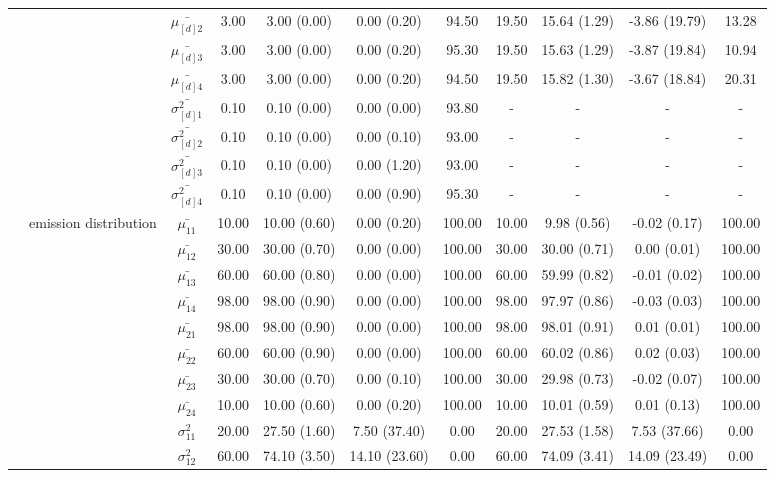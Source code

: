 \begin{table}[h]
{\begin{tabular}{ccccccccccc}
\multirow{39}{*}{} & \multirow{7}{*}{} & $\bar{\mu_{[d]2}}$ & 3.00 & 3.00 (0.00) & 0.00 (0.20) & 94.50 & 19.50 & 15.64 (1.29) & -3.86 (19.79) & 13.28 \\
 &  & $\bar{\mu_{[d]3}}$ & 3.00 & 3.00 (0.00) & 0.00 (0.20) & 95.30 & 19.50 & 15.63 (1.29) & -3.87 (19.84) & 10.94 \\
 &  & $\bar{\mu_{[d]4}}$ & 3.00 & 3.00 (0.00) & 0.00 (0.20) & 94.50 & 19.50 & 15.82 (1.30) & -3.67 (18.84) & 20.31 \\
 &  & $\bar{\sigma^2_{[d]1}}$ & 0.10 & 0.10 (0.00) & 0.00 (0.00) & 93.80 & - & - & - & - \\
 &  & $\bar{\sigma^2_{[d]2}}$ & 0.10 & 0.10 (0.00) & 0.00 (0.10) & 93.00 & - & - & - & - \\
 &  & $\bar{\sigma^2_{[d]3}}$ & 0.10 & 0.10 (0.00) & 0.00 (1.20) & 93.00 & - & - & - & - \\
 &  & $\bar{\sigma^2_{[d]4}}$ & 0.10 & 0.10 (0.00) & 0.00 (0.90) & 95.30 & - & - & - & - \\
 & emission distribution & $\bar{\mu_{11}}$ & 10.00 & 10.00 (0.60) & 0.00 (0.20) & 100.00 & 10.00 & 9.98 (0.56) & -0.02 (0.17) & 100.00 \\
 & \multirow{15}{*}{} & $\bar{\mu_{12}}$ & 30.00 & 30.00 (0.70) & 0.00 (0.00) & 100.00 & 30.00 & 30.00 (0.71) & 0.00 (0.01) & 100.00 \\
 &  & $\bar{\mu_{13}}$ & 60.00 & 60.00 (0.80) & 0.00 (0.00) & 100.00 & 60.00 & 59.99 (0.82) & -0.01 (0.02) & 100.00 \\
 &  & $\bar{\mu_{14}}$ & 98.00 & 98.00 (0.90) & 0.00 (0.00) & 100.00 & 98.00 & 97.97 (0.86) & -0.03 (0.03) & 100.00 \\
 &  & $\bar{\mu_{21}}$ & 98.00 & 98.00 (0.90) & 0.00 (0.00) & 100.00 & 98.00 & 98.01 (0.91) & 0.01 (0.01) & 100.00 \\
 &  & $\bar{\mu_{22}}$ & 60.00 & 60.00 (0.90) & 0.00 (0.00) & 100.00 & 60.00 & 60.02 (0.86) & 0.02 (0.03) & 100.00 \\
 &  & $\bar{\mu_{23}}$ & 30.00 & 30.00 (0.70) & 0.00 (0.10) & 100.00 & 30.00 & 29.98 (0.73) & -0.02 (0.07) & 100.00 \\
 &  & $\bar{\mu_{24}}$ & 10.00 & 10.00 (0.60) & 0.00 (0.20) & 100.00 & 10.00 & 10.01 (0.59) & 0.01 (0.13) & 100.00 \\
 &  & $\sigma^2_{11}$ & 20.00 & 27.50 (1.60) & 7.50 (37.40) & 0.00 & 20.00 & 27.53 (1.58) & 7.53 (37.66) & 0.00 \\
 &  & $\sigma^2_{12}$ & 60.00 & 74.10 (3.50) & 14.10 (23.60) & 0.00 & 60.00 & 74.09 (3.41) & 14.09 (23.49) & 0.00 \\

\end{tabular}}
\end{table}
